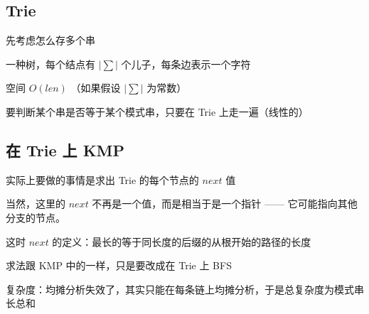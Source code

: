 
\subsection{Trie}

先考虑怎么存多个串

一种树，每个结点有 $|∑|$ 个儿子，每条边表示一个字符

空间 $O(len)$ （如果假设 $|∑|$ 为常数）

要判断某个串是否等于某个模式串，只要在 Trie 上走一遍（线性的）

\subsection{在 Trie 上 KMP}

实际上要做的事情是求出 Trie 的每个节点的 $next$ 值

当然，这里的 $next$ 不再是一个值，而是相当于是一个指针 —— 它可能指向其他分支的节点。

这时 $next$ 的定义：最长的等于同长度的后缀的从根开始的路径的长度

求法跟  KMP  中的一样，只是要改成在 Trie 上  BFS 

复杂度：均摊分析失效了，其实只能在每条链上均摊分析，于是总复杂度为模式串长总和
